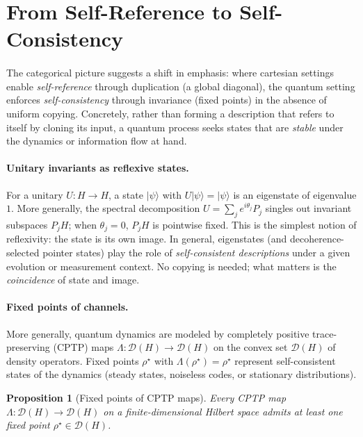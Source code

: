 \documentclass[11pt]{article}
\theoremstyle{upright}
\newtheorem{proposition}{Proposition}
\begin{document}
\section{From Self-Reference to Self-Consistency}
\label{sec:selfref-selfcon}

\paragraph{}
The categorical picture suggests a shift in emphasis: where cartesian settings enable \emph{self-reference} through duplication (a global diagonal), the quantum setting enforces \emph{self-consistency} through invariance (fixed points) in the absence of uniform copying. Concretely, rather than forming a description that refers to itself by cloning its input, a quantum process seeks states that are \emph{stable} under the dynamics or information flow at hand.

\paragraph{Unitary invariants as reflexive states.}
For a unitary $U:H\to H$, a state $|\psi\rangle$ with $U|\psi\rangle=|\psi\rangle$ is an eigenstate of eigenvalue $1$. More generally, the spectral decomposition $U=\sum_j e^{i\theta_j} P_j$ singles out invariant subspaces $P_jH$; when $\theta_j=0$, $P_jH$ is pointwise fixed. This is the simplest notion of reflexivity: the state is its own image. In general, eigenstates (and decoherence-selected pointer states) play the role of \emph{self-consistent descriptions} under a given evolution or measurement context. No copying is needed; what matters is the \emph{coincidence} of state and image.

\paragraph{Fixed points of channels.}
More generally, quantum dynamics are modeled by completely positive trace-preserving (CPTP) maps $\Lambda:\mathcal{D}(H)\to\mathcal{D}(H)$ on the convex set $\mathcal{D}(H)$ of density operators. Fixed points $\rho^\star$ with $\Lambda(\rho^\star)=\rho^\star$ represent self-consistent states of the dynamics (steady states, noiseless codes, or stationary distributions).

\begin{proposition}[Fixed points of CPTP maps]
\label{prop:cptp-fixed}
Every CPTP map $\Lambda:\mathcal{D}(H)\to\mathcal{D}(H)$ on a finite-dimensional Hilbert space admits at least one fixed point $\rho^\star\in\mathcal{D}(H)$.
\end{proposition}
\end{document}
